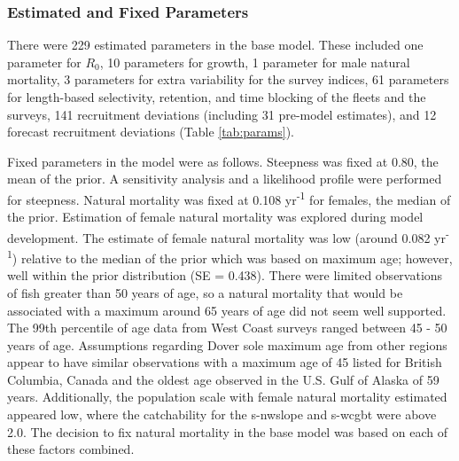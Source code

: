 \documentclass[11pt,
  english,
  a4paper,
]{article}
\begin{document}
\leavevmode\tagmcend\tagstructend\par


\hypertarget{estimated-and-fixed-parameters}{%
\subsubsection{Estimated and Fixed Parameters}\label{estimated-and-fixed-parameters}}

\leavevmode\tagmcend\tagstructend


There were 229 estimated parameters in the base model. These included one parameter for {\(R_0\)\leavevmode\tagmcend\tagstructend}, 10 parameters for growth, 1 parameter for male natural mortality, 3 parameters for extra variability for the survey indices, 61 parameters for length-based selectivity, retention, and time blocking of the fleets and the surveys, 141 recruitment deviations (including 31 pre-model estimates), and 12 forecast recruitment deviations (Table \ref{tab:params}).

\leavevmode\tagmcend\tagstructend\par


Fixed parameters in the model were as follows. Steepness was fixed at 0.80, the mean of the prior. A sensitivity analysis and a likelihood profile were performed for steepness. Natural mortality was fixed at 0.108 yr\textsuperscript{-1} for females, the median of the prior. Estimation of female natural mortality was explored during model development. The estimate of female natural mortality was low (around 0.082 yr\textsuperscript{-1}) relative to the median of the prior which was based on maximum age; however, well within the prior distribution (SE = 0.438). There were limited observations of fish greater than 50 years of age, so a natural mortality that would be associated with a maximum around 65 years of age did not seem well supported. The 99th percentile of age data from West Coast surveys ranged between 45 - 50 years of age. Assumptions regarding Dover sole maximum age from other regions appear to have similar observations with a maximum age of 45 listed for British Columbia, Canada and the oldest age observed in the U.S. Gulf of Alaska of 59 years. Additionally, the population scale with female natural mortality estimated appeared low, where the catchability for the \gls{s-nwslope} and \gls{s-wcgbt} were above 2.0. The decision to fix natural mortality in the base model was based on each of these factors combined.
\end{document}
